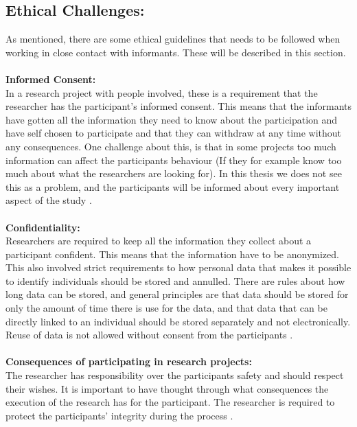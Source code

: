 \subsection{Ethical Challenges:}
As mentioned, there are some ethical guidelines that needs to be followed when working in close contact with informants. These will be described in this section. \\ \\
\textbf{Informed Consent:} \\
In a research project with people involved, these is a requirement that the researcher has the participant’s informed consent. This means that the informants have gotten all the information they need to know about the participation and have self chosen to participate and that they can withdraw at any time without any consequences. One challenge about this, is that in some projects too much information can affect the participants behaviour (If they for example know too much about what the researchers are looking for). In this thesis we does not see this as a problem, and the participants will be informed about every important aspect of the study \cite{qualitative}. \\ \\
\textbf{Confidentiality:}\\
Researchers are required to keep all the information they collect about a participant confident. This means that the information have to be anonymized. This also involved strict requirements to how personal data that makes it possible to identify individuals should be stored and annulled. There are rules about how long data can be stored, and general principles are that data should be stored for only the amount of time there is use for the data, and that data that can be directly linked to an individual should be stored separately and not electronically.  Reuse of data is not allowed without consent from the participants \cite{qualitative}. \\ \\
\textbf{Consequences of participating in research projects:}\\
The researcher has responsibility over the participants safety and should respect their wishes. It is important to have thought through what consequences the execution of the research has for the participant. The researcher is required to protect the participants’ integrity during the process \cite{qualitative}. \\ \\
